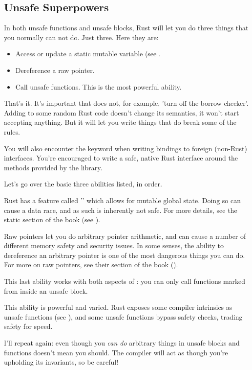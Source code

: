 \subsection*{Unsafe Superpowers}

In both unsafe functions and unsafe blocks, Rust will let you do three things that you normally can not do. Just three. Here they are:

\begin{itemize}
  \item{Access or update a static mutable variable (see .}
  \item{Dereference a raw pointer.}
  \item{Call unsafe functions. This is the most powerful ability.}
\end{itemize}

That's it. It's important that  does not, for example, 'turn off the borrow checker'. Adding  to some 
random Rust code doesn't change its semantics, it won't start accepting anything. But it will let you write things that do break 
some of the rules.

\blank

You will also encounter the  keyword when writing bindings to foreign (non-Rust) interfaces. You're encouraged to write 
a safe, native Rust interface around the methods provided by the library.

\blank

Let's go over the basic three abilities listed, in order.


Rust has a feature called '' which allows for mutable global state. Doing so can cause a data race, and as such 
is inherently not safe. For more details, see the static section of the book (see ).


Raw pointers let you do arbitrary pointer arithmetic, and can cause a number of different memory safety and security issues. In 
some senses, the ability to dereference an arbitrary pointer is one of the most dangerous things you can do. For more on raw pointers, 
see their section of the book ().


This last ability works with both aspects of : you can only call functions marked  from inside an unsafe block.

\blank

This ability is powerful and varied. Rust exposes some compiler intrinsics as unsafe functions (see ), 
and some unsafe functions bypass safety checks, trading safety for speed.

\blank

I'll repeat again: even though you \emph{can do} arbitrary things in unsafe blocks and functions doesn't mean you should. The compiler 
will act as though you're upholding its invariants, so be careful!
